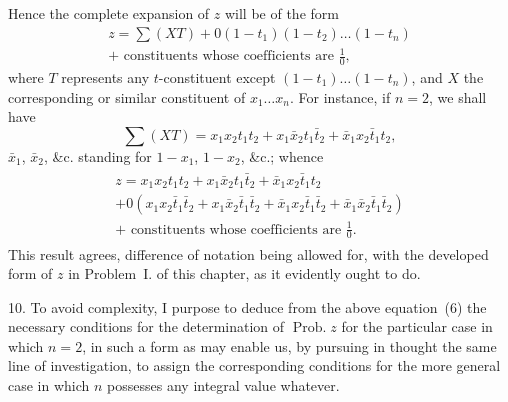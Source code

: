 \documentclass[oneside]{book}
\begin{document}
Hence the complete expansion of $z$ will be of the form
\begin{multline*}
  z = \sum(XT) + 0(1-t_1)(1-t_2)\dotsc (1-t_n)   \\
      + \text{ constituents whose coefficients are }\frac{1}{0},
  \tag{5}
\end{multline*}
where $T$ represents any $t$-constituent except
$(1-t_1)\dotsc (1-t_n)$,
and $X$ the corresponding or similar constituent of $x_1\dotsc x_n$.
For instance, if $n = 2$, we shall have
\begin{equation*}
\sum (XT) = x_1 x_2 t_1 t_2 + x_1 \bar{x}_2 t_1 \bar{t}_2 + \bar{x}_1 x_2 \bar{t}_1 t_2,
\end{equation*}
$\bar{x}_1$, $\bar{x}_2$, \&c. standing for $1 - x_1$, $1 - x_2$, \&c.; whence
\begin{gather*} \tag{6}
\begin{split}
z = x_1 x_2 t_1 t_2
+ x_1 \bar{x}_2 t_1 \bar{t}_2
+ \bar{x}_1 x_2 \bar{t}_1 t_2 \\
+ 0(x_1 x_2 \bar{t}_1 \bar{t}_2
+ x_1 \bar{x}_2 \bar{t}_1 \bar{t}_2
+ \bar{x}_1 x_2 \bar{t}_1 \bar{t}_2
+ \bar{x}_1 \bar{x}_2 \bar{t}_1 \bar{t}_2) \\
+ \text{ constituents whose coefficients are }\frac{1}{0}.
\end{split}
\end{gather*}
This result agrees, difference of notation being allowed for, with
the developed form of $z$ in Problem~I. of this chapter, as it
evidently ought to do.

10. To avoid complexity, I purpose to deduce from the above
equation~(6) the necessary conditions for the determination of
$\operatorname{Prob. } z$ for the particular case in which $n = 2$, in such a form as
may enable us, by pursuing in thought the same line of
investigation, to assign the corresponding conditions for the more
general case in which $n$ possesses any integral value whatever.
\end{document}
